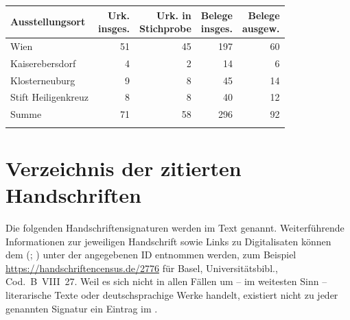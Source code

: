 \begin{tabularx}{\linewidth}{X r r r r}
\lsptoprule
Ausstellungsort
	& \makecell{Urk.\\ insges.}
	& \makecell{Urk. in\\ Stichprobe}
	& \makecell{Belege\\ insges.}
	& \makecell{Belege\\ ausgew.}
	\\
\midrule

Wien
	& 51
	& 45
	& 197
	& 60
	\\

Kaiserebersdorf
	& 4
	& 2
	& 14
	& 6
	\\

Klosterneuburg
	& 9
	& 8
	& 45
	& 14
	\\

Stift Heiligenkreuz
	& 8
	& 8
	& 40
	& 12
	\\

\midrule

Summe
	& 71
	& 58
	& 296
	& 92
	\\

\lspbottomrule
\end{tabularx}


\chapter{Verzeichnis der zitierten Handschriften}
\label{ch:hssverz}

Die folgenden Handschriftensignaturen werden im Text genannt. Weiterführende
Informationen zur jeweiligen Handschrift sowie Links zu
Digitalisaten können dem  (;
\nosh\cite{hsc}) unter der angegebenen ID entnommen werden, zum Beispiel
\url{https://handschriftencensus.de/2776} für Basel, Universitätsbibl.,
Cod.~B~VIII~27. Weil es sich nicht in allen Fällen um -- im weitesten Sinn --
literarische Texte oder deutsch\-sprachige Werke handelt, existiert nicht zu
jeder genannten Signatur ein Eintrag im .\\

